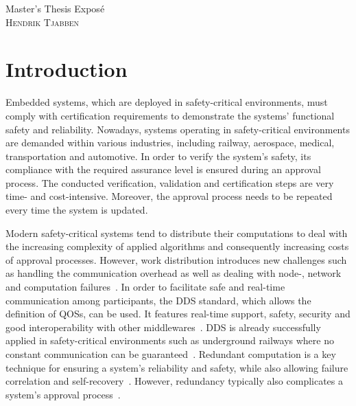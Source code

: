 \documentclass[a4paper, 12pt]{scrartcl}
\begin{document}
\begin{center}
  \Huge{Master's Thesis Expos\'{e}}\\
  \large{\textsc{Hendrik Tjabben}}
\end{center}


\section*{Introduction}
Embedded systems, which are deployed in safety-critical environments, must comply with certification requirements to demonstrate the systems' functional safety and reliability.
Nowadays, systems operating in safety-critical environments are demanded within various industries, including railway, aerospace, medical, transportation and automotive.
In order to verify the system's safety, its compliance with the required assurance level is ensured during an approval process.
The conducted verification, validation and certification steps are very time- and cost-intensive.
Moreover, the approval process needs to be repeated every time the system is updated.

Modern safety-critical systems tend to distribute their computations to deal with the increasing complexity of applied algorithms and consequently increasing costs of approval processes.
However, work distribution introduces new challenges such as handling the communication overhead as well as dealing with node-, network and computation failures~\cite{DistributedSafety2020}.
In order to facilitate safe and real-time communication among participants, the \ac{DDS} standard, which allows the definition of \acp{QOS}, can be used.
It features real-time support, safety, security and good interoperability with other middlewares~\cite{DistributedSafety2020}.
\ac{DDS} is already successfully applied in safety-critical environments such as underground railways where no constant communication can be guaranteed~\cite{DDSInURail}.
Redundant computation is a key technique for ensuring a system's reliability and safety, while also allowing failure correlation and self-recovery~\cite{TanenbaumSteen07}.
However, redundancy typically also complicates a system's approval process~\cite{ReliabilityThroughRedundancy}.

\end{document}
